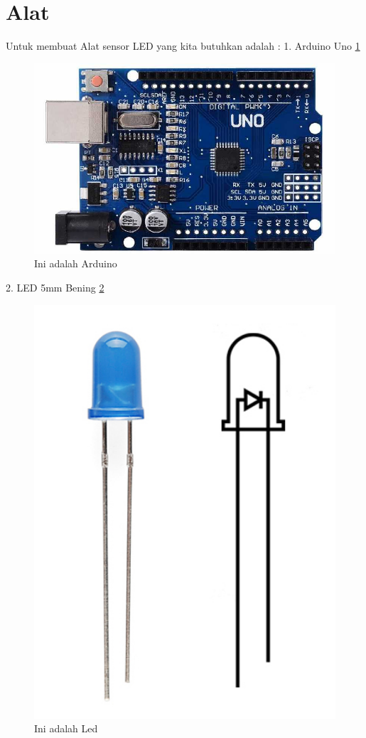 \documentclass{article}
\begin{document}
\section{Alat}
Untuk membuat Alat sensor LED yang kita butuhkan adalah :
 1. Arduino Uno
 \ref{arduino}
  \begin{figure}[ht]
  \centerline{\includegraphics[width=1\textwidth]{../figures/arduino.jpg}}
  \caption{Ini adalah Arduino}
  \label{arduino}
  \end{figure}

 2. LED 5mm Bening
 \ref{led}
  \begin{figure}[ht]
  \centerline{\includegraphics[width=1\textwidth]{../figures/led.jpg}}
  \caption{Ini adalah Led}
  \label{led}
  \end{figure}
\end{document}
